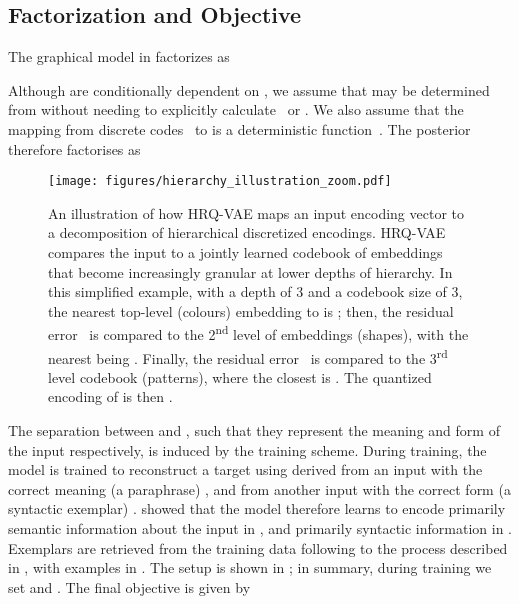 \documentclass[11pt]{article}
\begin{document}
\subsection{Factorization and Objective}

The graphical model in  factorizes as



Although   are conditionally dependent on
, we assume that
 may be determined from  without needing
to explicitly calculate~ or . We also assume that the mapping
from discrete codes~ to  is a deterministic
function~. The posterior
therefore factorises as





\begin{figure*}[t!]
    \centering
\texttt{[image: figures/hierarchy\_illustration\_zoom.pdf]}  
\caption{An illustration of how HRQ-VAE maps an input encoding vector  to a decomposition of hierarchical discretized encodings. HRQ-VAE compares the input to a jointly learned codebook of embeddings that become increasingly granular at lower depths of hierarchy. In this simplified example, with a depth of 3 and a codebook size of 3, the nearest top-level (colours) embedding to  is ; then, the residual error~ is compared to the 2\textsuperscript{nd} level of embeddings (shapes), with the nearest being . Finally, the residual error~ is compared to the 3\textsuperscript{rd} level codebook (patterns), where the closest is . The quantized encoding of  is then  .}
    \vspace{-0.4cm}
    \label{fig:illustration}
\end{figure*}

The separation between  and
, such that they represent the meaning and form of the input
respectively, is induced by the
training scheme. During training, the model is trained to reconstruct
a target  using  derived from an input with the
correct meaning (a paraphrase) , and  from
another input with the correct form (a syntactic exemplar)
. \citet{hosking-lapata-2021-factorising} showed that the model therefore learns to encode primarily semantic information about the input in , and primarily syntactic information in . Exemplars are retrieved from the training data
following to the process described in 
\citet{hosking-lapata-2021-factorising}, with examples in . The setup is shown in
; in summary, during training we set
 and . The final objective is given by
\end{document}
